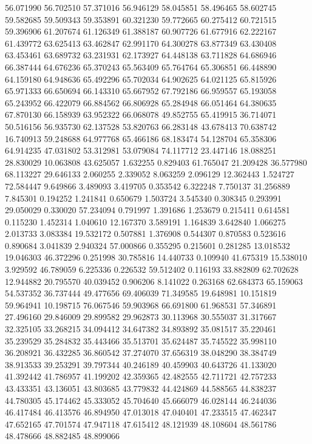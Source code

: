 56.071990
56.702510
57.371016
56.946129
58.045851
58.496465
58.602745
59.582685
59.509343
59.353891
60.321230
59.772665
60.275412
60.721515
59.396906
61.207674
61.126349
61.388187
60.907726
61.677916
62.222167
61.439772
63.625413
63.462847
62.991170
64.300278
63.877349
63.430408
63.453461
63.689732
63.231931
62.173927
64.448138
63.711828
64.686946
66.387444
64.676236
65.370243
65.563409
65.764764
65.306851
66.448890
64.159180
64.948636
65.492296
65.702034
64.902625
64.021125
65.815926
65.971333
66.650694
66.143310
65.667952
67.792186
66.959557
65.193058
65.243952
66.422079
66.884562
66.806928
65.284948
66.051464
64.380635
67.870130
66.158939
63.952322
66.068078
49.852755
65.419915
36.714071
50.516156
56.935730
62.137528
53.820763
66.283148
43.678413
70.638742
16.740913
59.248688
64.977768
65.466186
68.183474
54.128704
65.358306
64.914235
47.031802
53.312981
53.079084
74.117712
23.447146
18.088251
28.830029
10.063808
43.625057
1.632255
0.829403
61.765047
21.209428
36.577980
68.113227
29.646133
2.060255
2.339052
8.063259
2.096129
12.362443
1.524727
72.584447
9.649866
3.489093
3.419705
0.353542
6.322248
7.750137
31.256889
7.845301
0.194252
1.241841
0.650679
1.503724
3.545340
0.308345
0.293991
29.050029
0.330020
57.234094
0.791997
1.391686
1.253679
0.215411
0.614581
0.115230
1.452314
1.040610
12.167370
3.589191
1.164839
3.642840
1.066275
2.013733
3.083384
19.532172
0.507881
1.376908
0.544307
0.870583
0.523616
0.890684
3.041839
2.940324
57.000866
0.355295
0.215601
0.281285
13.018532
19.046303
46.372296
0.251998
30.785816
14.440733
0.109940
41.675319
15.538010
3.929592
46.789059
6.225336
0.226532
59.512402
0.116193
33.882809
62.702628
12.944882
20.795570
40.039452
0.906206
8.141022
0.263168
62.684373
65.159063
54.537352
36.737444
49.477656
69.406039
71.349585
19.648981
10.151819
59.964941
10.198715
76.067546
59.903968
66.691800
61.968531
57.346891
27.496160
29.846009
29.899582
29.962873
30.113968
30.555037
31.317667
32.325105
33.268215
34.094412
34.647382
34.893892
35.081517
35.220461
35.239529
35.284832
35.443466
35.513701
35.624487
35.745522
35.998110
36.208921
36.432285
36.860542
37.274070
37.656319
38.048290
38.384749
38.913533
39.253291
39.797344
40.246189
40.459903
40.643726
41.133020
41.392442
41.786957
41.199202
42.359365
42.482555
42.711721
42.757233
43.433351
43.136051
43.803685
43.779832
44.424869
44.588565
44.838237
44.780305
45.174462
45.333052
45.704640
45.666079
46.028144
46.244036
46.417484
46.413576
46.894950
47.013018
47.040401
47.233515
47.462347
47.652165
47.701574
47.947118
47.615412
48.121939
48.108604
48.561786
48.478666
48.882485
48.899066
